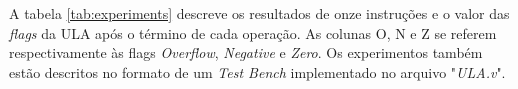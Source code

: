 \documentclass[11pt,a4paper,titlepage]{article}
\begin{document}
A tabela \ref{tab:experiments} descreve os resultados de onze  instruções e o valor das \textit{flags} da 
ULA após o término de cada operação. As colunas O, N e Z se referem respectivamente às flags \textit{Overflow}, 
\textit{Negative} e \textit{Zero}. Os experimentos também estão descritos no formato de um \textit{Test Bench} 
implementado no arquivo "\textit{ULA.v}".

%
%	
%
%	
%	
%					
\end{document}

